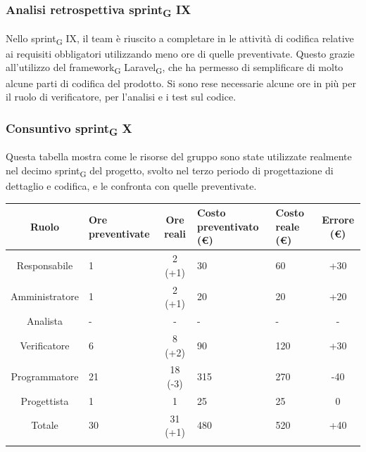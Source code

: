 \subsubsection{Analisi retrospettiva sprint\textsubscript{G} IX}

Nello sprint\textsubscript{G} IX, il team è riuscito a completare in le attività di codifica relative ai requisiti obbligatori utilizzando meno ore di quelle preventivate. Questo grazie all'utilizzo del framework\textsubscript{G} Laravel\textsubscript{G}, che ha permesso di semplificare di molto alcune parti di codifica del prodotto.
Si sono rese necessarie alcune ore in più per il ruolo di verificatore, per l'analisi e i test sul codice.

\newpage
\subsubsection{Consuntivo sprint\textsubscript{G} X}

Questa tabella mostra come le risorse del gruppo sono state utilizzate realmente nel decimo sprint\textsubscript{G} del progetto, svolto nel terzo periodo di progettazione di dettaglio e codifica, e le confronta con quelle preventivate.

\setlength\extrarowheight{5pt}
\begin{tabularx}{\textwidth}{|c|XcXX|c|}
	\hline
	\rowcolor{white}
	\textbf{Ruolo} & \textbf{Ore preventivate} & \textbf{Ore reali} & \textbf{Costo preventivato (€)} & \textbf{Costo reale (€)} & \textbf{Errore (€)} \\
	\hline
	Responsabile & 1 & 2 (+1) & 30 & 60 & +30 \\
	Amministratore & 1 & 2 (+1) & 20 & 20 & +20 \\
	Analista & - & - & - & - & - \\
	Verificatore & 6 & 8 (+2) & 90 & 120 & +30 \\
	Programmatore & 21 & 18 (-3) & 315 & 270 & -40 \\
	Progettista & 1 & 1 & 25 & 25 & 0 \\
	\hline
	Totale & 30 & 31 (+1) & 480 & 520 & +40 \\
	\hline
	\rowcolor{white}
	\caption{Consuntivo ore e costi per ruolo del decimo sprint\textsubscript{G}}
\end{tabularx}

